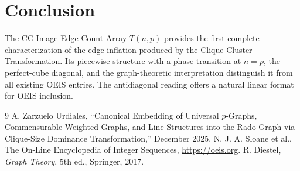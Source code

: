 \documentclass[11pt,a4paper]{article}
\theoremstyle{definition}
\begin{document}
\section{Conclusion}

The CC-Image Edge Count Array $T(n, p)$ provides the first complete characterization of the edge inflation produced by the Clique-Cluster Transformation. Its piecewise structure with a phase transition at $n = p$, the perfect-cube diagonal, and the graph-theoretic interpretation distinguish it from all existing OEIS entries. The antidiagonal reading offers a natural linear format for OEIS inclusion.

\begin{thebibliography}{9}
 A. Zarzuelo Urdiales, ``Canonical Embedding of Universal $p$-Graphs, Commensurable Weighted Graphs, and Line Structures into the Rado Graph via Clique-Size Dominance Transformation,'' December 2025.
 N. J. A. Sloane et al., The On-Line Encyclopedia of Integer Sequences, \url{https://oeis.org}.
 R. Diestel, \textit{Graph Theory}, 5th ed., Springer, 2017.
\end{thebibliography}
\end{document}
